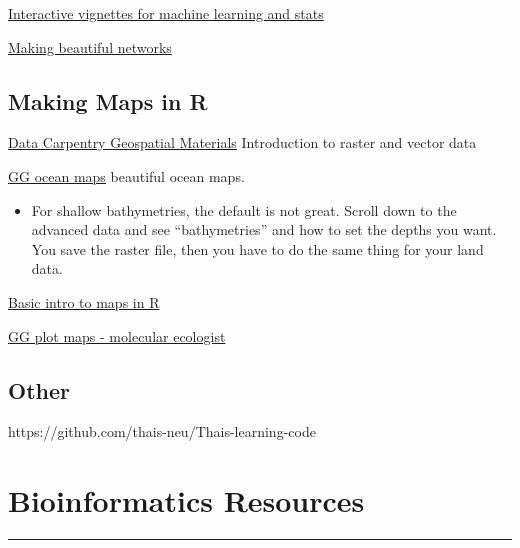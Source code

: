 \documentclass[
  letterpaper,
  DIV=11,
  numbers=noendperiod]{scrreprt}
\providecommand{\tightlist}{%
  \setlength{\itemsep}{0pt}\setlength{\parskip}{0pt}}\usepackage{longtable,booktabs,array}
\begin{document}
\href{https://distill.pub/}{Interactive vignettes for machine learning
and stats}

\href{https://gephi.org/}{Making beautiful networks}

\hypertarget{making-maps-in-r}{%
\section*{\texorpdfstring{\textbf{Making Maps in
R}}{Making Maps in R}}\label{making-maps-in-r}}


\href{https://datacarpentry.org/organization-geospatial/}{Data Carpentry
Geospatial Materials} Introduction to raster and vector data

\href{https://mikkovihtakari.github.io/ggOceanMaps/articles/ggOceanMaps.html\#advanced-use-1}{GG
ocean maps} beautiful ocean maps.

\begin{itemize}
\tightlist
\item
  For shallow bathymetries, the default is not great. Scroll down to the
  advanced data and see ``bathymetries'' and how to set the depths you
  want. You save the raster file, then you have to do the same thing for
  your land data.
\end{itemize}

\href{https://rpubs.com/kvistj/mapping}{Basic intro to maps in R}

\href{https://www.molecularecologist.com/2016/07/01/making-maps-in-r-volume-2-ggplots/}{GG
plot maps - molecular ecologist}

\hypertarget{other}{%
\section*{\texorpdfstring{\textbf{Other}}{Other}}\label{other}}


https://github.com/thais-neu/Thais-learning-code

\hypertarget{bioinformatics-resources}{%
\chapter{Bioinformatics Resources}\label{bioinformatics-resources}}

\begin{center}\rule{0.5\linewidth}{0.5pt}\end{center}
\end{document}
